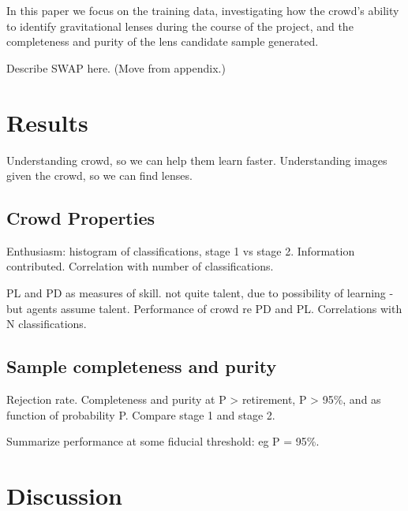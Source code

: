 \documentclass[useAMS,usenatbib,a4paper]{mn2e}
\begin{document}
In this paper we focus on the training data,  investigating  how the 
crowd's ability to identify gravitational lenses during the course of
the project, and the completeness and purity of the lens candidate
sample generated.

Describe SWAP here. (Move from appendix.)



\section{Results}
\label{sec:results}

Understanding crowd, so we can help them learn faster. Understanding
images given the crowd, so we can find lenses.


\subsection{Crowd Properties}
\label{sec:results:crowd}

Enthusiasm: histogram of classifications, stage 1 vs stage 2. Information
contributed. Correlation with number of classifications. 

PL and PD as measures of skill. not quite talent, due to possibility of
learning - but agents assume talent. Performance of crowd re PD and PL.
Correlations with N classifications.



\subsection{Sample completeness and purity}
\label{sec:results:sample}

Rejection rate. Completeness and purity at P > retirement, P > 95\%, and 
as function of probability P. Compare stage 1 and stage 2. 

Summarize performance at some fiducial threshold: eg P = 95\%.



\section{Discussion}
\label{sec:discuss}
\end{document}
